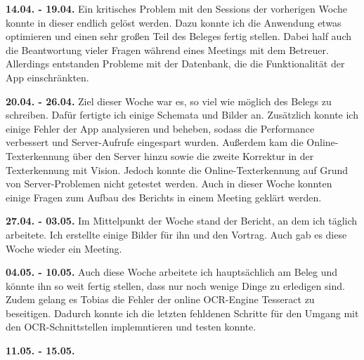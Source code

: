 \documentclass[notables, nomenclature, oneside, 150]{HSMW-Thesis}
\begin{document}
	\textbf{14.04. - 19.04.}
	Ein kritisches Problem mit den Sessions der vorherigen Woche konnte in dieser endlich gelöst werden. Dazu konnte ich die Anwendung etwas optimieren und einen sehr großen Teil des Beleges fertig stellen. Dabei half auch die Beantwortung vieler Fragen während eines Meetings mit dem Betreuer. Allerdings entstanden Probleme mit der Datenbank, die die Funktionalität der App einschränkten.
	
	\textbf{20.04. - 26.04.}
	Ziel dieser Woche war es, so viel wie möglich des Belegs zu schreiben. Dafür fertigte ich einige Schemata und Bilder an. Zusätzlich konnte ich einige Fehler der App analysieren und beheben, sodass die Performance verbessert und Server-Aufrufe eingespart wurden. Außerdem kam die Online-Texterkennung über den Server hinzu sowie die zweite Korrektur in der Texterkennung mit Vision. Jedoch konnte die Online-Texterkennung auf Grund von Server-Problemen nicht getestet werden. Auch in dieser Woche konnten einige Fragen zum Aufbau des Berichts in einem Meeting geklärt werden. 
	
	\textbf{27.04. - 03.05.}
	Im Mittelpunkt der Woche stand der Bericht, an dem ich täglich arbeitete. Ich erstellte einige Bilder für ihn und den Vortrag. Auch gab es diese Woche wieder ein Meeting.
	
	\textbf{04.05. - 10.05.}
	Auch diese Woche arbeitete ich hauptsächlich am Beleg und könnte ihn so weit fertig stellen, dass nur noch wenige Dinge zu erledigen sind. Zudem gelang es Tobias die Fehler der online OCR-Engine Tesseract zu beseitigen. Dadurch konnte ich die letzten fehldenen Schritte für den Umgang mit den OCR-Schnittstellen implemntieren und testen konnte. 
	
	\textbf{11.05. - 15.05.}




\end{document}
